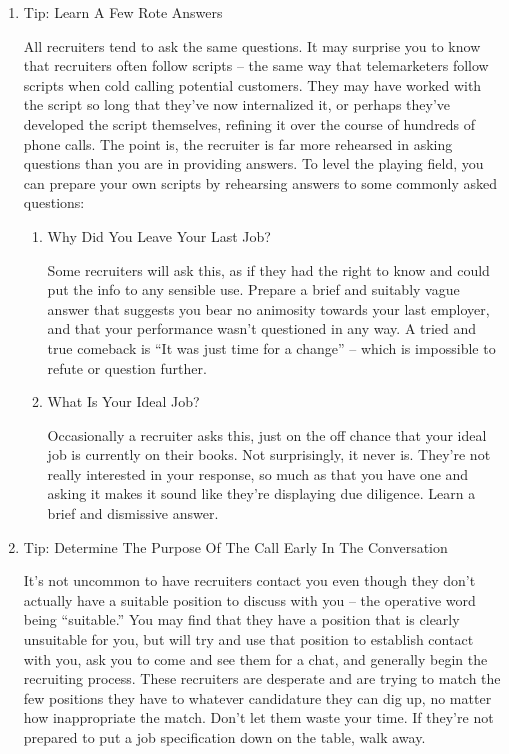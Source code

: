 \documentclass{article}
\begin{document}
\begin{enumerate}
\begin{enumerate}
\item Tip: Learn A Few Rote Answers
\label{sec:orgheadline112}

All recruiters tend to ask the same questions. It may surprise you to
know that recruiters often follow scripts -- the same way that
telemarketers follow scripts when cold calling potential customers. They
may have worked with the script so long that they've now internalized
it, or perhaps they've developed the script themselves, refining it over
the course of hundreds of phone calls. The point is, the recruiter is
far more rehearsed in asking questions than you are in providing
answers. To level the playing field, you can prepare your own scripts by
rehearsing answers to some commonly asked questions:

\begin{enumerate}
\item Why Did You Leave Your Last Job?
\label{sec:orgheadline110}

Some recruiters will ask this, as if they had the right to know and
could put the info to any sensible use. Prepare a brief and suitably
vague answer that suggests you bear no animosity towards your last
employer, and that your performance wasn't questioned in any way. A
tried and true comeback is “It was just time for a change” -- which is
impossible to refute or question further.

\item What Is Your Ideal Job?
\label{sec:orgheadline111}

Occasionally a recruiter asks this, just on the off chance that your
ideal job is currently on their books. Not surprisingly, it never is.
They're not really interested in your response, so much as that you have
one and asking it makes it sound like they're displaying due diligence.
Learn a brief and dismissive answer.
\end{enumerate}

\item Tip: Determine The Purpose Of The Call Early In The Conversation
\label{sec:orgheadline113}

It's not uncommon to have recruiters contact you even though they don't
actually have a suitable position to discuss with you -- the operative
word being “suitable.” You may find that they have a position that is
clearly unsuitable for you, but will try and use that position to
establish contact with you, ask you to come and see them for a chat, and
generally begin the recruiting process. These recruiters are desperate
and are trying to match the few positions they have to whatever
candidature they can dig up, no matter how inappropriate the match.
Don't let them waste your time. If they're not prepared to put a job
specification down on the table, walk away.


\end{enumerate}
\end{enumerate}
\end{document}
